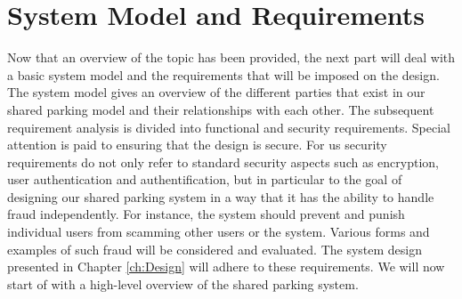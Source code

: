 \chapter{System Model and Requirements}
\label{ch:System Model and Requirements}
Now that an overview of the topic has been provided, the next part will deal with a basic system model and the requirements that will be imposed on the design. The system model gives an overview of the different parties that exist in our shared parking model and their relationships with each other. The subsequent requirement analysis is divided into functional and security requirements. Special attention is paid to ensuring that the design is secure. For us security requirements do not only refer to standard security aspects such as encryption, user authentication and authentification, but in particular to the goal of designing our shared parking system in a way that it has the ability to handle fraud independently. For instance, the system should prevent and punish individual users from scamming other users or the system. Various forms and examples of such fraud will be considered and evaluated. The system design presented in Chapter \ref{ch:Design} will adhere to these requirements. We will now start of with a high-level overview of the shared parking system.

